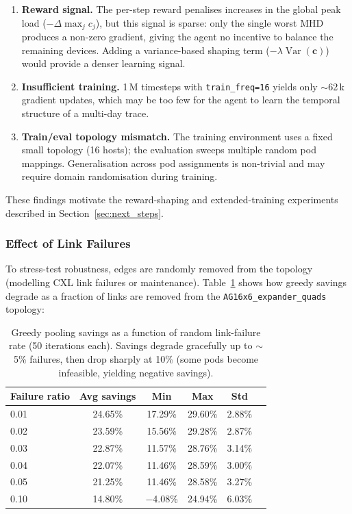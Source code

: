 \documentclass[11pt]{article}
\begin{document}
\begin{enumerate}
    \item \textbf{Reward signal.}  The per-step reward penalises increases
          in the global peak load ($-\Delta \max_j c_j$), but this signal
          is sparse: only the single worst MHD produces a non-zero gradient,
          giving the agent no incentive to balance the remaining devices.
          Adding a variance-based shaping term
          ($-\lambda \operatorname{Var}(\mathbf{c})$) would provide a
          denser learning signal.

    \item \textbf{Insufficient training.}  1\,M timesteps with
          \texttt{train\_freq=16} yields only $\sim$62\,k gradient updates,
          which may be too few for the agent to learn the temporal structure
          of a multi-day trace.

    \item \textbf{Train/eval topology mismatch.}  The training environment
          uses a fixed small topology (16 hosts); the evaluation sweeps
          multiple random pod mappings.  Generalisation across pod
          assignments is non-trivial and may require domain randomisation
          during training.
\end{enumerate}

These findings motivate the reward-shaping and extended-training experiments
described in Section~\ref{sec:next_steps}.

\subsubsection*{Effect of Link Failures}

To stress-test robustness, edges are randomly removed from the topology
(modelling CXL link failures or maintenance).  Table~\ref{tab:failures} shows
how greedy savings degrade as a fraction of links are removed from the
\texttt{AG16x6\_expander\_quads} topology:

\begin{table}[H]
\centering
\small
\begin{tabular}{lccccc}
\toprule
\textbf{Failure ratio} & \textbf{Avg savings} & \textbf{Min} & \textbf{Max} & \textbf{Std} \\
\midrule
0.01 & 24.65\% & 17.29\% & 29.60\% & 2.88\% \\
0.02 & 23.59\% & 15.56\% & 29.28\% & 2.87\% \\
0.03 & 22.87\% & 11.57\% & 28.76\% & 3.14\% \\
0.04 & 22.07\% & 11.46\% & 28.59\% & 3.00\% \\
0.05 & 21.25\% & 11.46\% & 28.58\% & 3.27\% \\
0.10 & 14.80\% & $-$4.08\% & 24.94\% & 6.03\% \\
\bottomrule
\end{tabular}
\caption{Greedy pooling savings as a function of random link-failure rate
(50 iterations each).  Savings degrade gracefully up to $\sim$5\% failures,
then drop sharply at 10\% (some pods become infeasible, yielding negative
savings).}
\label{tab:failures}
\end{table}
\end{document}
